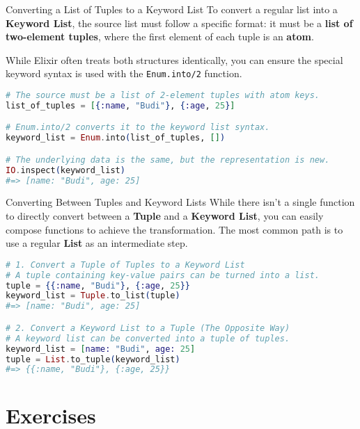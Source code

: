 \documentclass[aspectratio=169, table]{beamer}
\begin{document}
\begin{frame}[fragile]{Converting a List of Tuples to a Keyword List}
\vspace{20pt}
To convert a regular list into a \textbf{Keyword List}, the source list must follow a specific format: it must be a \textbf{list of two-element tuples}, where the first element of each tuple is an \textbf{atom}.

While Elixir often treats both structures identically, you can ensure the special keyword syntax is used with the \texttt{Enum.into/2} function.

\begin{lstlisting}[language=Elixir]
# The source must be a list of 2-element tuples with atom keys.
list_of_tuples = [{:name, "Budi"}, {:age, 25}]

# Enum.into/2 converts it to the keyword list syntax.
keyword_list = Enum.into(list_of_tuples, [])

# The underlying data is the same, but the representation is new.
IO.inspect(keyword_list)
#=> [name: "Budi", age: 25]
\end{lstlisting}
\end{frame}

\begin{frame}[fragile]{Converting Between Tuples and Keyword Lists}
\vspace{20pt}
While there isn't a single function to directly convert between a \textbf{Tuple} and a \textbf{Keyword List}, you can easily compose functions to achieve the transformation. The most common path is to use a regular \textbf{List} as an intermediate step.

\begin{lstlisting}[language=Elixir]
# 1. Convert a Tuple of Tuples to a Keyword List
# A tuple containing key-value pairs can be turned into a list.
tuple = {{:name, "Budi"}, {:age, 25}}
keyword_list = Tuple.to_list(tuple)
#=> [name: "Budi", age: 25]

# 2. Convert a Keyword List to a Tuple (The Opposite Way)
# A keyword list can be converted into a tuple of tuples.
keyword_list = [name: "Budi", age: 25]
tuple = List.to_tuple(keyword_list)
#=> {{:name, "Budi"}, {:age, 25}}
\end{lstlisting}
\end{frame}


\section{Exercises}
\end{document}
